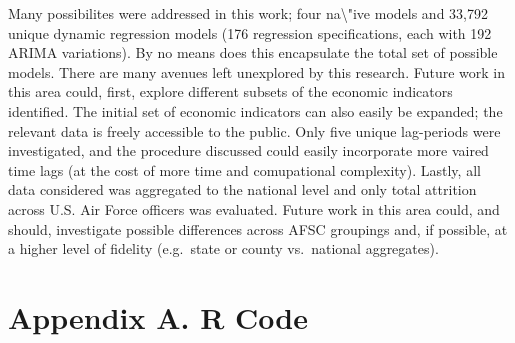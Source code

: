 \documentclass[12pt,letterpaper,toc=flat,oneside]{report}
\theoremstyle{definition}
\theoremstyle{definition}
\theoremstyle{definition}
\theoremstyle{remark}
\begin{document}
Many possibilites were addressed in this work; four
na\textbackslash{}"ive models and 33,792 unique dynamic regression
models (176 regression specifications, each with 192 ARIMA variations).
By no means does this encapsulate the total set of possible models.
There are many avenues left unexplored by this research. Future work in
this area could, first, explore different subsets of the economic
indicators identified. The initial set of economic indicators can also
easily be expanded; the relevant data is freely accessible to the
public. Only five unique lag-periods were investigated, and the
procedure discussed could easily incorporate more vaired time lags (at
the cost of more time and comupational complexity). Lastly, all data
considered was aggregated to the national level and only total attrition
across U.S. Air Force officers was evaluated. Future work in this area
could, and should, investigate possible differences across AFSC
groupings and, if possible, at a higher level of fidelity (e.g.~state or
county vs.~national aggregates).

\newpage

\hypertarget{appendix-a.-r-code}{%
\chapter*{Appendix A. R Code}\label{appendix-a.-r-code}}

\tiny
\end{document}
